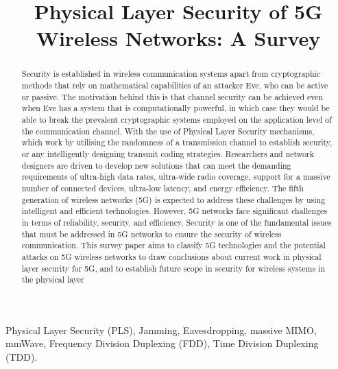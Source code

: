 \documentclass[conference]{IEEEtran}
\begin{document}
\title{Physical Layer Security of 5G Wireless Networks: A Survey\\
}

\author{
}

\maketitle
\thispagestyle{plain}
\pagestyle{plain}
\begin{abstract}
Security is established in wireless communication systems apart from cryptographic methods that rely on mathematical capabilities of an attacker Eve, who can be active or passive. The motivation behind this is that channel security can be achieved even when Eve has a system that is computationally powerful, in which case they would be able to break the prevalent cryptographic systems employed on the application level of the communication channel. With the use of Physical Layer Security mechanisms, which work by utilising the randomness of a transmission channel to establish security, or any intelligently designing transmit coding strategies. Researchers and network designers are driven to develop new solutions that can meet the demanding requirements of ultra-high data rates, ultra-wide radio coverage, support for a massive number of connected devices, ultra-low latency, and energy efficiency. The fifth generation of wireless networks (5G) is expected to address these challenges by using intelligent and efficient technologies. However, 5G networks face significant challenges in terms of reliability, security, and efficiency. Security is one of the fundamental issues that must be addressed in 5G networks to ensure the security of wireless communication. This survey paper aims to classify 5G technologies and the potential attacks on 5G wireless networks to draw conclusions about current work in physical layer security for 5G, and to establish future scope in security for wireless systems in the physical layer
\end{abstract}

\begin{IEEEkeywords}
Physical Layer Security (PLS), Jamming, Eavesdropping, massive MIMO, mmWave, Frequency Division Duplexing (FDD), Time Division Duplexing (TDD).
\end{IEEEkeywords}
\end{document}
